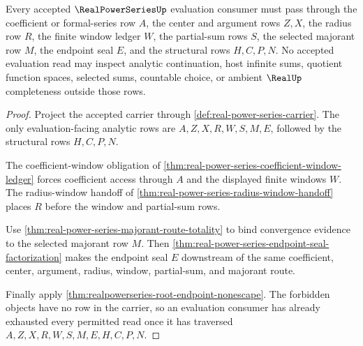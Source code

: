 \begin{theorem}
\label{thm:real-power-series-evaluation-window-exhaustion}
Every accepted $\RealPowerSeriesUp$ evaluation consumer must pass through the coefficient or formal-series row $A$, the center and argument rows $Z,X$, the radius row $R$, the finite window ledger $W$, the partial-sum rows $S$, the selected majorant row $M$, the endpoint seal $E$, and the structural rows $H,C,P,N$. No accepted evaluation read may inspect analytic continuation, host infinite sums, quotient function spaces, selected sums, countable choice, or ambient $\RealUp$ completeness outside those rows.
\end{theorem}
\begin{proof}
Project the accepted carrier through \autoref{def:real-power-series-carrier}. The only evaluation-facing analytic rows are $A,Z,X,R,W,S,M,E$, followed by the structural rows $H,C,P,N$.

The coefficient-window obligation of \autoref{thm:real-power-series-coefficient-window-ledger} forces coefficient access through $A$ and the displayed finite windows $W$. The radius-window handoff of \autoref{thm:real-power-series-radius-window-handoff} places $R$ before the window and partial-sum rows.

Use \autoref{thm:real-power-series-majorant-route-totality} to bind convergence evidence to the selected majorant row $M$. Then \autoref{thm:real-power-series-endpoint-seal-factorization} makes the endpoint seal $E$ downstream of the same coefficient, center, argument, radius, window, partial-sum, and majorant route.

Finally apply \autoref{thm:realpowerseries-root-endpoint-nonescape}. The forbidden objects have no row in the carrier, so an evaluation consumer has already exhausted every permitted read once it has traversed $A,Z,X,R,W,S,M,E,H,C,P,N$.
\end{proof}

